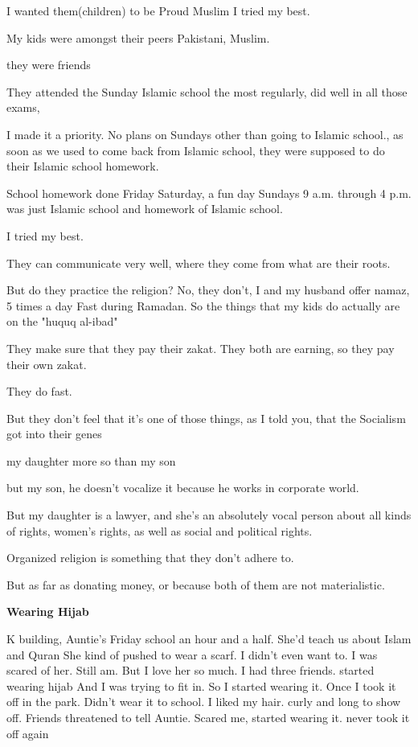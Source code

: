 \begin{FoundPoem}
I wanted them(children) to be 
 Proud 	           Muslim 
I tried my best.

My kids were amongst their peers
 Pakistani,
  Muslim.  	

they were friends 

They attended the Sunday Islamic school 
the most regularly,
 did well in all those exams,

I made it a priority.
No plans on Sundays
other than   going to Islamic school.,
as soon as we used to come back from Islamic school,
they were supposed to do
their Islamic school homework.

School homework 	done 	 Friday
Saturday, a fun day 
Sundays 9 a.m. through 4 p.m.
was just Islamic school
and homework of Islamic school.

 I tried my best.

They can communicate very well,
where they come from
what are their roots.

But do they practice the religion?
No, they don't,
I and my husband offer namaz, 5 times a day
Fast during Ramadan.
So the things that my kids do
actually
are on the "huquq al-ibad"

They make sure
that they pay their zakat.
They both are earning,
so they pay
their own zakat.

They do fast.

But they don't feel
that it's one of those things,
as I told you,
that the Socialism
got into their genes

my daughter more so
than my son

but my son,
he doesn't vocalize it
because he works
in corporate world.

But my daughter is a lawyer,
and she's an absolutely vocal person
about all kinds of rights,
women's rights,
as well as social and political rights.

Organized religion
is something
that they don't adhere to.

But as far as donating money,
or
because both of them
are not materialistic.

\end{FoundPoem}

\textbf{Wearing Hijab}

\begin{FoundPoem}
K building, 
Auntie’s
Friday school
an hour and a half. 
She’d teach us about Islam and Quran
She kind of pushed 
to wear a scarf. 
I didn’t even want to. 
I was scared of her. Still am. 
But I love her 
so much. 
I had three friends. 
started wearing hijab 
And I was trying to fit in.
So I started wearing it. 
Once
I took it off in the park. 
Didn’t wear it to school. 
I liked my hair. 
curly and long        to show off. 
Friends threatened to tell Auntie. 
Scared me, started wearing it. 
never took it off again
\end{FoundPoem}

